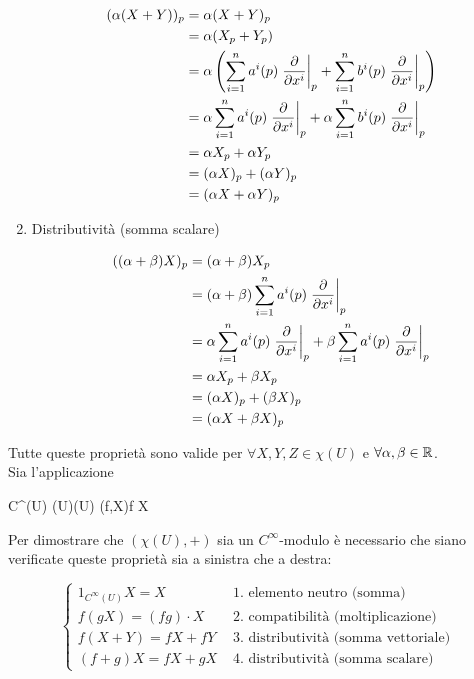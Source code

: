 \begin{enumerate}
		\begin{align}
			\begin{split}
				(\alpha (X + Y))_{p} &= \alpha (X + Y)_{p}\\
				&= \alpha (X_{p} + Y_{p})\\
				&= \alpha \left( \sum_{i=1}^{n} a^{i} (p) \eval{ \pdv{x^{i}} }_{p} + \sum_{i=1}^{n} b^{i} (p) \eval{ \pdv{x^{i}} }_{p} \right)\\
				&= \alpha \sum_{i=1}^{n} a^{i} (p) \eval{ \pdv{x^{i}} }_{p} + \alpha \sum_{i=1}^{n} b^{i} (p) \eval{ \pdv{x^{i}} }_{p}\\
				&= \alpha X_{p} + \alpha Y_{p}\\
				&= (\alpha X)_{p} + (\alpha Y)_{p}\\
				&= (\alpha X + \alpha Y)_{p}
			\end{split}
		\end{align}
	
	\item Distributività (somma scalare)
	
		\begin{align}
			\begin{split}
				((\alpha + \beta) X)_{p} &= (\alpha + \beta) X_{p}\\
				&= (\alpha + \beta) \sum_{i=1}^{n} a^{i} (p) \eval{ \pdv{x^{i}} }_{p}\\
				&= \alpha \sum_{i=1}^{n} a^{i} (p) \eval{ \pdv{x^{i}} }_{p} + \beta \sum_{i=1}^{n} a^{i} (p) \eval{ \pdv{x^{i}} }_{p}\\
				&= \alpha X_{p} + \beta X_{p}\\
				&= (\alpha X)_{p} + (\beta X)_{p}\\
				&= (\alpha X + \beta X)_{p} 
			\end{split}
		\end{align}
\end{enumerate}

Tutte queste proprietà sono valide per $ \forall X, Y, Z \in \chi(U) $ e $ \forall \alpha, \beta \in \mathbb{R} $.\\
Sia l'applicazione

\map{\cdot}%
	{C^{\infty}(U) \times \chi(U)}{\chi(U)}%
	{(f,X)}{f X}

Per dimostrare che $ (\chi(U),+) $ sia un $ C^{\infty} $-modulo è necessario che siano verificate queste proprietà sia a sinistra che a destra:

\begin{equation}
	\begin{cases}
		1_{C^{\infty}(U)} X = X & \text{ 1. elemento neutro (somma) }\\
		f (g X) = (f g) \cdot X & \text{ 2. compatibilità (moltiplicazione) }\\
		f (X+Y) = f X + f Y & \text{ 3. distributività (somma vettoriale) }\\
		(f+g) X = f X + g X & \text{ 4. distributività (somma scalare) }
	\end{cases}
\end{equation}

